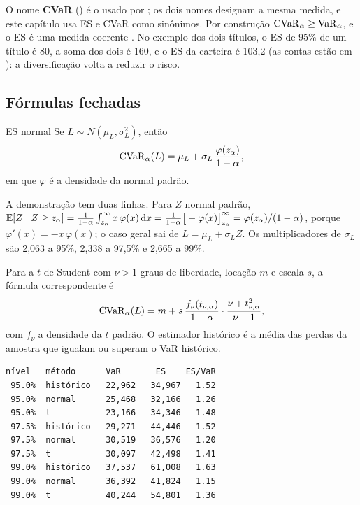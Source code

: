 O nome \textbf{CVaR} () é o usado por \citet{rockafellar2000}; os dois nomes designam a mesma medida, e este capítulo usa ES e CVaR como sinônimos. Por construção $\operatorname{CVaR}_\alpha \ge \operatorname{VaR}_\alpha$, e o ES é uma medida coerente \citep{acerbi2002}. No exemplo dos dois títulos, o ES de 95\% de um título é 80, a soma dos dois é 160, e o ES da carteira é 103,2 (as contas estão em ): a diversificação volta a reduzir o risco.

\subsection{Fórmulas fechadas}

\begin{resultado}{ES normal}
Se $L \sim N(\mu_L, \sigma_L^2)$, então
\begin{equation}
  \operatorname{CVaR}_\alpha(L) = \mu_L + \sigma_L\, \frac{\varphi(z_\alpha)}{1-\alpha} ,
  \label{eq:c07-es-normal}
\end{equation}
em que $\varphi$ é a densidade da normal padrão.
\end{resultado}

A demonstração tem duas linhas. Para $Z$ normal padrão, $\operatorname{\mathbb{E}}[Z \mid Z \ge z_\alpha] = \frac{1}{1-\alpha}\int_{z_\alpha}^{\infty} x\,\varphi(x)\mathop{}\!\mathrm{d} x = \frac{1}{1-\alpha}\big[-\varphi(x)\big]_{z_\alpha}^{\infty} = \varphi(z_\alpha)/(1-\alpha)$, porque $\varphi'(x) = -x\,\varphi(x)$; o caso geral sai de $L = \mu_L + \sigma_L Z$. Os multiplicadores de $\sigma_L$ são 2,063 a 95\%, 2,338 a 97,5\% e 2,665 a 99\%.

Para a $t$ de Student com $\nu > 1$ graus de liberdade, locação $m$ e escala $s$, a fórmula correspondente é \citep{mcneil2015}
\begin{equation}
  \operatorname{CVaR}_\alpha(L) = m + s\, \frac{f_\nu(t_{\nu,\alpha})}{1-\alpha} \cdot \frac{\nu + t_{\nu,\alpha}^2}{\nu - 1} ,
  \label{eq:c07-es-t}
\end{equation}
com $f_\nu$ a densidade da $t$ padrão. O estimador histórico é a média das perdas da amostra que igualam ou superam o VaR histórico.


\begin{lstlisting}[style=saida]
nível   método      VaR       ES    ES/VaR
 95.0%  histórico   22,962   34,967   1.52
 95.0%  normal      25,468   32,166   1.26
 95.0%  t           23,166   34,346   1.48
 97.5%  histórico   29,271   44,446   1.52
 97.5%  normal      30,519   36,576   1.20
 97.5%  t           30,097   42,498   1.41
 99.0%  histórico   37,537   61,008   1.63
 99.0%  normal      36,392   41,824   1.15
 99.0%  t           40,244   54,801   1.36
\end{lstlisting}

